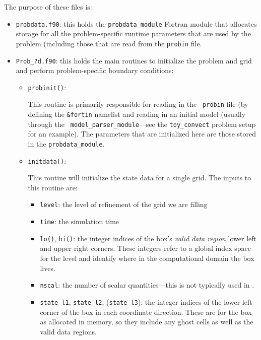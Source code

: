 The purpose of these files is:
\begin{itemize}
\item {\tt probdata.f90}: this holds the {\tt probdata\_module} Fortran module
  that allocates storage for all the problem-specific runtime parameters that
  are used by the problem (including those that are read from the {\tt probin}
  file.

\item {\tt Prob\_?d.f90}: this holds the main routines to
  initialize the problem and grid and perform problem-specific boundary
  conditions:

  \begin{itemize}
  \item {\tt probinit()}:

    This routine is primarily responsible for reading in the {\tt
      probin} file (by defining the {\tt \&fortin} namelist and
    reading in an initial model (usually through the {\tt
      model\_parser\_module}---see the {\tt toy\_convect} problem
    setup for an example).  The parameters that are initialized
    here are those stored in the {\tt probdata\_module}.

  \item {\tt initdata()}:

    This routine will initialize the state data for a single grid.
    The inputs to this routine are:
    \begin{itemize}
    \item {\tt level}: the level of refinement of the grid we are filling

    \item {\tt time}: the simulation time

    \item {\tt lo()}, {\tt hi()}: the integer indices of the box's {\em
      valid data region} lower left and upper right corners.  These
      integers refer to a global index space for the level and
      identify where in the computational domain the box lives.

    \item {\tt nscal}: the number of scalar quantities---this is not typically
      used in \lmc.

    \item {\tt state\_l1}, {\tt state\_l2}, ({\tt state\_l3}): the
      integer indices of the lower left corner of the box in each
      coordinate direction.  These are for the box as allocated in memory,
      so they include any ghost cells as well as the valid data regions.


\end{itemize}
\end{itemize}
\end{itemize}
